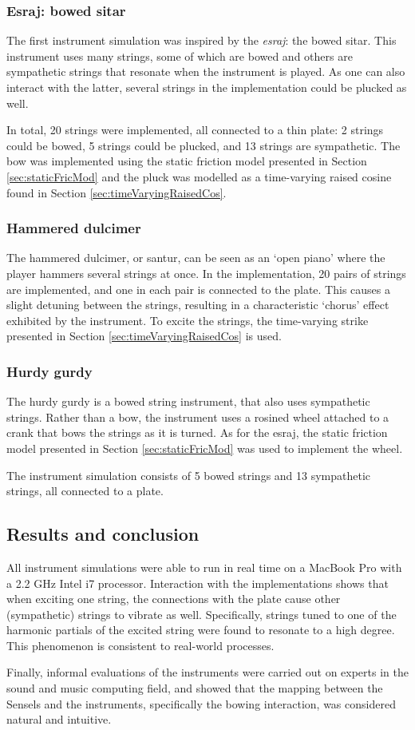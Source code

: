\subsubsection{Esraj: bowed sitar}
The first instrument simulation was inspired by the \textit{esraj}: the bowed sitar. This instrument uses many strings, some of which are bowed and others are sympathetic strings that resonate when the instrument is played. As one can also interact with the latter, several strings in the implementation could be plucked as well. 

In total, 20 strings were implemented, all connected to a thin plate: 2 strings could be bowed, 5 strings could be plucked, and 13 strings are sympathetic. The bow was implemented using the static friction model presented in Section \ref{sec:staticFricMod} and the pluck was modelled as a time-varying raised cosine found in Section \ref{sec:timeVaryingRaisedCos}.

\subsubsection{Hammered dulcimer}
The hammered dulcimer, or santur, can be seen as an `open piano' where the player hammers several strings at once. In the implementation, 20 pairs of strings are implemented, and one in each pair is connected to the plate. This causes a slight detuning between the strings, resulting in a characteristic `chorus' effect exhibited by the instrument. To excite the strings, the time-varying strike presented in Section \ref{sec:timeVaryingRaisedCos} is used.

\subsubsection{Hurdy gurdy}
The hurdy gurdy is a bowed string instrument, that also uses sympathetic strings. Rather than a bow, the instrument uses a rosined wheel attached to a crank that bows the strings as it is turned. As for the esraj, the static friction model presented in Section \ref{sec:staticFricMod} was used to implement the wheel. 

The instrument simulation consists of 5 bowed strings and 13 sympathetic strings, all connected to a plate. 

\subsection{Results and conclusion}
All instrument simulations were able to run in real time on a MacBook Pro with a 2.2 GHz Intel i7 processor.
Interaction with the implementations shows that when exciting one string, the connections with the plate cause other (sympathetic) strings to vibrate as well. Specifically, strings tuned to one of the harmonic partials of the excited string were found to resonate to a high degree. This phenomenon is consistent to real-world processes.

Finally, informal evaluations of the instruments were carried out on experts in the sound and music computing field, and showed that the mapping between the Sensels and the instruments, specifically the bowing interaction, was considered natural and intuitive.